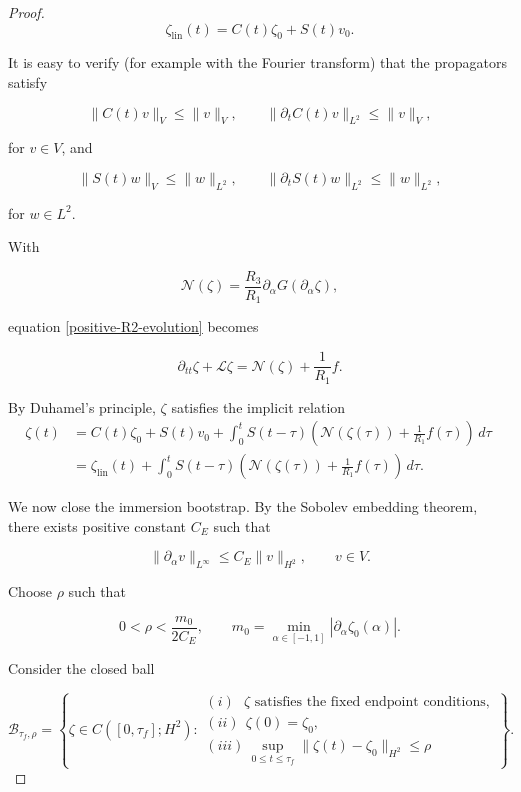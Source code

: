 \documentclass{article}[12pt]
\theoremstyle{Theorem}
\begin{document}
\begin{proof}
$$
    \zeta_{\mathrm{lin}}(t)
    =
    C(t)\zeta_0+S(t)v_0.
$$

It is easy to verify (for example with the Fourier transform) that the propagators satisfy

$$
    \|C(t)v\|_V\leq\|v\|_V,
    \qquad
    \|\partial_tC(t)v\|_{L^2}\leq\|v\|_V,
$$

for \(v\in V\), and

$$
    \|S(t)w\|_V\leq\|w\|_{L^2},
    \qquad
    \|\partial_tS(t)w\|_{L^2}\leq\|w\|_{L^2},
$$

for \(w\in L^2\).
\newline

With

$$
    \mathcal N(\zeta)
    =
    \frac{R_3}{R_1}
    \partial_\alpha G(\partial_\alpha\zeta),
$$

equation \eqref{positive-R2-evolution} becomes

$$
    \partial_{tt}\zeta+\mathcal L\zeta
    =
    \mathcal N(\zeta)+\frac{1}{R_1}f.
$$

By Duhamel's principle, $\zeta$ satisfies the implicit relation
\begin{equation}
\begin{aligned}
\zeta(t)
&=
C(t)\zeta_0+S(t)v_0+
\int_0^t
S(t-\tau)
\left(
\mathcal N(\zeta(\tau))
+\frac{1}{R_1}f(\tau)
\right)\,d\tau\ \\
&=
\zeta_{\mathrm{lin}}(t)
+
\int_0^t
S(t-\tau)
\left(
\mathcal N(\zeta(\tau))
+\frac{1}{R_1}f(\tau)
\right)\,d\tau.
\end{aligned}
\label{positive-R2-duhamel}
\end{equation}

We now close the immersion bootstrap. By the Sobolev embedding theorem, there exists positive constant \(C_E\) such that

$$
    \|\partial_\alpha v\|_{L^\infty}
    \leq C_E\|v\|_{H^2},
    \qquad v\in V.
$$

Choose $\rho$ such that

$$
    0<\rho<\frac{m_0}{2C_E},
    \qquad
    m_0=
    \min_{\alpha\in[-1,1]}
    |\partial_\alpha\zeta_0(\alpha)|.
$$

Consider the closed ball

$$
    \mathcal B_{\tau_f,\rho}
    =
    \left\{
        \zeta\in C([0,\tau_f];H^2):
        \begin{array}{l}
        (i) \ \ \ \zeta\text{ satisfies the fixed endpoint conditions},\\[1mm]
        (ii)\ \ \zeta(0)=\zeta_0,\\[1mm]
        (iii)\ \displaystyle
        \sup_{0\leq t\leq \tau_f}
        \|\zeta(t)-\zeta_0\|_{H^2}\leq\rho
        \end{array}
    \right\}.
$$


\end{proof}
\end{document}
